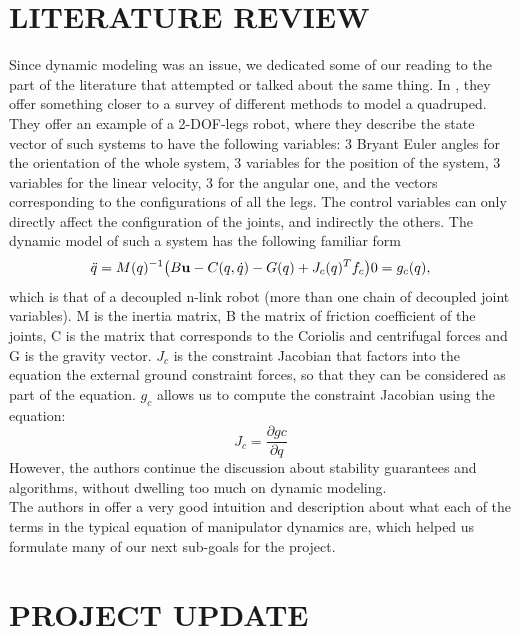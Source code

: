 \documentclass[letterpaper, 10 pt, conference]{ieeeconf}  %
\begin{document}
\section{LITERATURE REVIEW}
Since dynamic modeling was an issue, we dedicated some of our reading to the part of the literature that attempted or talked about the same thing. In \cite{hardt2003dynamic}, they offer something closer to a survey of different methods to model a quadruped. They offer an example of a 2-DOF-legs robot, where they describe the state vector of such systems to have the following variables: 3 Bryant Euler angles for the orientation of the whole system, 3 variables for the position of the system, 3 variables for the linear velocity, 3 for the angular one, and the vectors corresponding to the configurations of all the legs. The control variables can only directly affect the configuration of the joints, and indirectly the others.
The dynamic model of such a system has the following familiar form
$$
\ddot{q} = M(q)^{-1}\big(B\textbf{u} - C(q,\dot{q}) - G(q) + J_c(q)^T f_c\big)
\\
0 = g_c(q),
$$
which is that of a decoupled n-link robot (more than one chain of decoupled joint variables). M is the inertia matrix, B the matrix of friction coefficient of the joints, C is the matrix that corresponds to the Coriolis and centrifugal forces and G is the gravity vector. $J_c$ is the constraint Jacobian that factors into the equation the external ground constraint forces, so that they can be considered as part of the equation. $g_c$ allows us to compute the constraint Jacobian using the equation:
$$
J_c = \frac{\partial gc}{\partial q}
$$
However, the authors continue the discussion about stability guarantees and algorithms, without dwelling too much on dynamic modeling.
\\
The authors in \cite{ferguene2009dynamic} offer a very good intuition and description about what each of the terms in the typical equation of manipulator dynamics are, which helped us formulate many of our next sub-goals for the project.

\section{PROJECT UPDATE}
\end{document}
